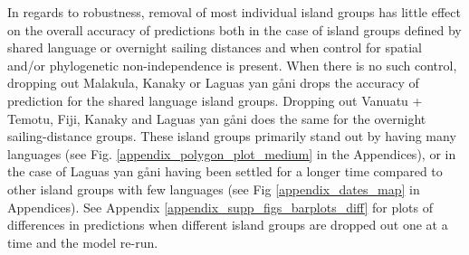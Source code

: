 \documentclass[unnumsec,webpdf,modern,medium]{oup-authoring-template}
\begin{document}
In regards to robustness, removal of most individual island groups has little effect on the overall accuracy of predictions both in the case of island groups defined by shared language or overnight sailing distances and when control for spatial and/or phylogenetic non-independence is present. When there is no such control, dropping out Malakula, Kanaky or Laguas yan gåni drops the accuracy of prediction for the shared language island groups. Dropping out Vanuatu + Temotu, Fiji, Kanaky and Laguas yan gåni does the same for the overnight sailing-distance groups. These island groups primarily stand out by having many languages (see Fig. \ref{appendix_polygon_plot_medium} in the Appendices), or in the case of Laguas yan gåni having been settled for a longer time compared to other island groups with few languages (see Fig \ref{appendix_dates_map} in Appendices). See Appendix \ref{appendix_supp_figs_barplots_diff} for plots of differences in predictions when different island groups are dropped out one at a time and the model re-run.



\end{document}
